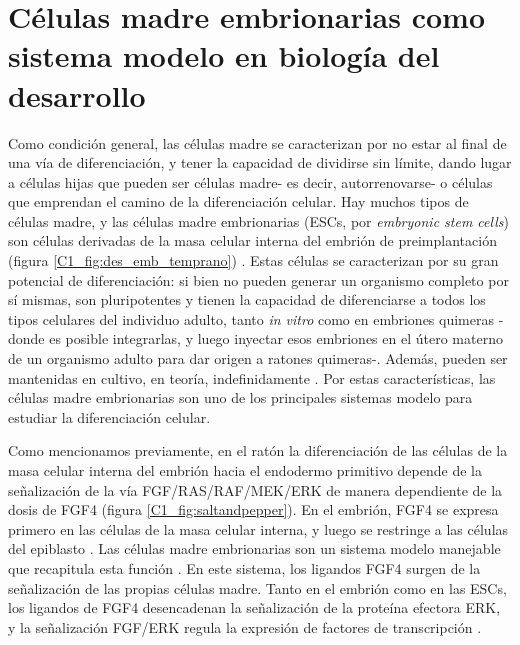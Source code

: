 \documentclass[./main.tex]{subfiles}
\begin{document}
\section{Células madre embrionarias como sistema modelo en biología del desarrollo}
\label{C1_sec:ESC}

Como condición general, las células madre se caracterizan por no estar al final de una vía de diferenciación, y tener la capacidad de dividirse sin límite, dando lugar a células hijas que pueden ser células madre- es decir, autorrenovarse- o células que emprendan el camino de la diferenciación celular. Hay muchos tipos de células madre, y las células madre embrionarias (ESCs, por \textit{embryonic stem cells}) son células derivadas de la masa celular interna del embrión de preimplantación (figura \ref{C1_fig:des_emb_temprano}) \cite{Ohtsuka2008}. Estas células se caracterizan por su gran potencial de diferenciación: si bien no pueden generar un organismo completo por sí mismas, son pluripotentes y tienen la capacidad de diferenciarse a todos los tipos celulares del individuo adulto, tanto \textit{in vitro} como en embriones quimeras -donde es posible integrarlas, y luego inyectar esos embriones en el útero materno de un organismo adulto para dar origen a ratones quimeras-\cite{Evans1981, Martin1981,Moustafa1972,Gardner1968}. Además, pueden ser mantenidas en cultivo, en teoría, indefinidamente \cite{Hiyama2007}. Por estas características, las células madre embrionarias son uno de los principales sistemas modelo para estudiar la diferenciación celular. 


Como mencionamos previamente, en el ratón la diferenciación de las células de la masa celular interna del embrión hacia el endodermo primitivo depende de la señalización de la vía FGF/RAS/RAF/MEK/ERK de manera dependiente de la dosis de FGF4 (figura \ref{C1_fig:saltandpepper}). En el embrión, FGF4 se expresa primero en las células de la masa celular interna, y luego se restringe a las células del epiblasto \cite{Guo2010}. Las células madre embrionarias son un sistema modelo manejable que recapitula esta función \cite{Raina2021,Schroeter2015,Kunath2007,Molotkov2017,Coumoul2003}. En este sistema, los ligandos FGF4 surgen de la señalización de las propias células madre. Tanto en el embrión como en las ESCs, los ligandos de FGF4 desencadenan la señalización de la proteína efectora ERK, y la señalización FGF/ERK regula la expresión de factores de transcripción \cite{Kang2013,Krawchuk2013,Kunath2007,Nichols2009,Boroviak2014,Stavridis2007}. 
\end{document}
